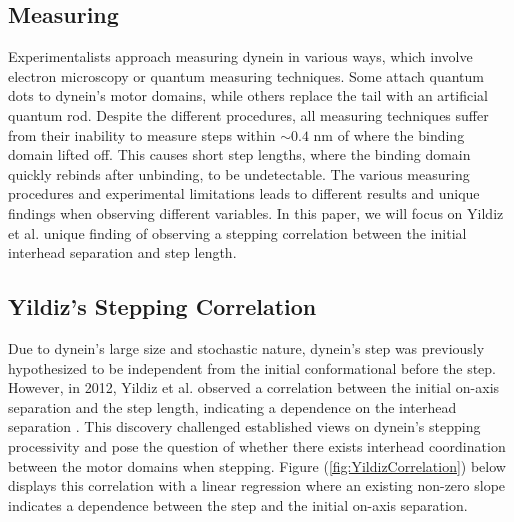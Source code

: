 \subsection{Measuring}

Experimentalists approach measuring dynein in various ways, which involve electron microscopy or quantum measuring techniques. Some attach quantum dots to dynein's motor domains, while others replace the tail with an artificial quantum rod. Despite the different procedures, all measuring techniques suffer from their inability to measure steps within $\sim 0.4$ nm of where the binding domain lifted off. This causes short step lengths, where the binding domain quickly rebinds after unbinding, to be undetectable. The various measuring procedures and experimental limitations leads to different results and unique findings when observing different variables. In this paper, we will focus on Yildiz et al. unique finding of observing a stepping correlation between the initial interhead separation and step length. 


\subsection{Yildiz's Stepping Correlation}

Due to dynein's large size and stochastic nature, dynein's step was previously hypothesized to be independent from the initial conformational before the step. However, in 2012, Yildiz et al. observed a correlation between the initial on-axis separation and the step length, indicating a dependence on the interhead separation \cite{Dewitt2012}. This discovery challenged established views on dynein's stepping processivity and pose the question of whether there exists interhead coordination between the motor domains when stepping. Figure (\ref{fig:YildizCorrelation}) below displays this correlation with a linear regression where an existing non-zero slope indicates a dependence between the step and the initial on-axis separation.

